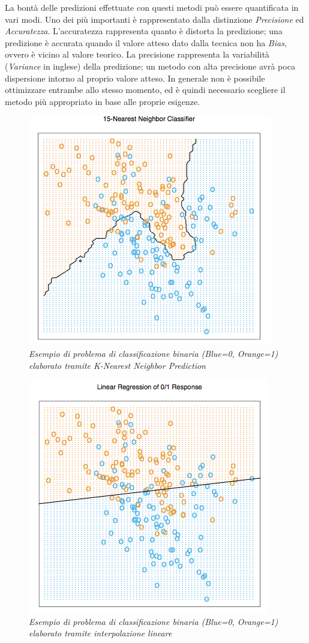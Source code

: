 \documentclass[12pt,openright,twoside,a4paper]{book}
\begin{document}
La bontà delle predizioni effettuate con questi metodi può essere quantificata in vari modi.
Uno dei più importanti è rappresentato dalla distinzione \textit{Precisione} ed \textit{Accuratezza}.
L'accuratezza rappresenta quanto è distorta la predizione; una predizione è accurata quando il valore atteso dato dalla tecnica non ha \textit{Bias}, ovvero è vicino al valore teorico.
La precisione rappresenta la variabilità (\textit{Variance} in inglese) della predizione; un metodo con alta precisione avrà poca dispersione intorno al proprio valore atteso.
In generale non è possibile ottimizzare entrambe allo stesso momento, ed è quindi necessario scegliere il metodo più appropriato in base alle proprie esigenze.

\begin{figure}[!h]
\centering
\includegraphics[width=0.45\linewidth]{neighclass}
\caption{\textit{Esempio di problema di classificazione binaria (Blue=0, Orange=1) elaborato tramite K-Nearest Neighbor Prediction}}
\label{neighclass}
\end{figure}

\begin{figure}[!h]
\centering
\includegraphics[width=0.45\linewidth]{linclass}
\caption{\textit{Esempio di problema di classificazione binaria (Blue=0, Orange=1) elaborato tramite interpolazione lineare}}
\label{linclass}
\end{figure}
\end{document}

